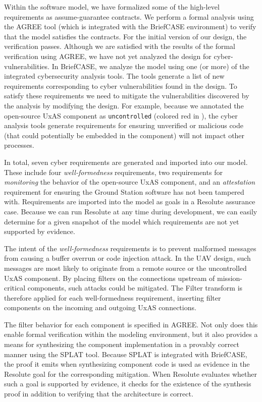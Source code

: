 Within the software model, we have formalized some of the high-level requirements as assume-guarantee contracts.  We perform a formal analysis using the AGREE tool (which is integrated with the BriefCASE environment) to verify that the model satisfies the contracts.  For the initial version of our design, the verification passes.
%
Although we are satisfied with the results of the formal verification using AGREE, we have not yet analyzed the design for cyber-vulnerabilities.  
In BriefCASE, we analyze the model using one (or more) of the integrated cybersecurity analysis tools.  The tools generate a list of new requirements corresponding to cyber vulnerabilities found in the design.  To satisfy these requirements we need to mitigate the vulnerabilities discovered by the analysis by modifying the design.
%
For example, because we annotated the open-source UxAS component as \texttt{uncontrolled} (colored red in ), the cyber analysis tools generate requirements for ensuring unverified or malicious code (that could potentially be embedded in the component) will not impact other processes. 

In total, seven cyber requirements are generated and imported into our model.  These include four \textit{well-formedness} requirements, two requirements for \textit{monitoring} the behavior of the open-source UxAS component, and an \textit{attestation} requirement for ensuring the Ground Station software has not been tampered with.  Requirements are imported into the model as goals in a Resolute assurance case.  Because we can run Resolute at any time during development, we can easily determine for a given snapshot of the model which requirements are not yet supported by evidence.

The intent of the \textit{well-formedness} requirements is to prevent malformed messages from causing a buffer overrun or code injection attack.  In the UAV design, such messages are most likely to originate from a remote source or the uncontrolled UxAS component.  By placing filters on the connections upstream of mission-critical components, such attacks could be mitigated.  The Filter transform is therefore applied for each well-formedness requirement, inserting filter components on the incoming and outgoing UxAS connections.  

The filter behavior for each component is specified in AGREE.  Not only does this enable formal verification within the modeling environment, but it also provides a means for synthesizing the component implementation in a provably correct manner using the SPLAT tool.  Because SPLAT is integrated with BriefCASE, the proof it emits when synthesizing component code is used as evidence in the Resolute goal for the corresponding mitigation.  When Resolute evaluates whether such a goal is supported by evidence, it checks for the existence of the synthesis proof in addition to verifying that the architecture is correct.  

